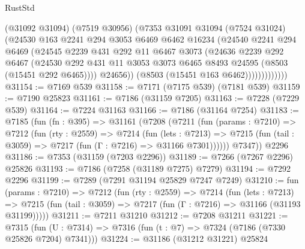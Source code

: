 \begin{lexlean}{RustStd}
\begin{coremodule}
{\begin{coremodule}
{{{{{{{{{{{{{{{{{{{{{{{{{{{{{{{{                      (@31092 @31094)
                      (@7519 @30956)
                      (@7353
                        @31091
                        @31094
                        (@7524 @31024)
                        (@24530
                          @163
                          @2241
                          @294
                          @3053
                          @6469
                          @6462
                          @16234
                          (@24540
                            @2241
                            @294
                            @6469
                            (@24545
                              @2239
                              @431
                              @292
                              @11
                              @6467
                              @3073
                              (@24636
                                @2239
                                @292
                                @6467
                                (@24530
                                  @292
                                  @431
                                  @11
                                  @3053
                                  @3073
                                  @6465
                                  @8493
                                  @24595
                                  (@8503 (@15451 @292 @6465))))
                              @24656))
                          (@8503 (@15451 @163 @6462)))))))))))))
@31154 := @7169 @539
@31158 := @7171 (@7175 @539) (@7181 @539)
@31159 := @7190 @25823
@31161 := @7186 (@31159 @7205)
@31163 := @7228 (@7229 @539)
@31164 := @7224 @31163
@31166 := @7186 (@31164 @7254)
@31183 := @7185
    (fun (fn : @395) =>
    @31161
      (@7208
        (@7211
          (fun (params : @7210) =>
          @7212
            (fun (rty : @2559) =>
            @7214
              (fun (lets : @7213) =>
              @7215 (fun (tail : @3059) => @7217 (fun (Γ : @7216) => @31166 @7301))))))
        @7347))
    @2296
@31186 := @7353 (@31159 (@7203 @2296))
@31189 := @7266 (@7267 @2296) @25826
@31193 := @7186 (@7258 (@31189 @7275) @7279)
@31194 := @7292 @2296
@31199 := @7289 (@7291 @31194 @25829 @7247 @7249)
@31210 := fun (params : @7210) =>
  @7212
    (fun (rty : @2559) =>
    @7214
      (fun (lets : @7213) =>
      @7215 (fun (tail : @3059) => @7217 (fun (Γ : @7216) => @31166 (@31193 @31199)))))
@31211 := @7211 @31210
@31212 := @7208 @31211
@31221 := @7315
    (fun (U : @7314) => @7316 (fun (t : @7) => @7324 (@7186 (@7330 @25826 @7204) @7341)))
@31224 := @31186 (@31212 @31221) @25824
}}}}}}}}}}}}}}}}}}}}}}}}}}}}}}}}
\end{coremodule}}
\end{coremodule}
\end{lexlean}
